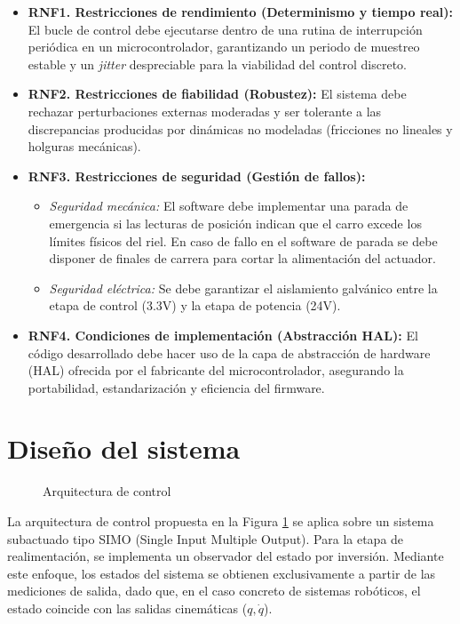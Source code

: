 \documentclass[11pt,fleqn]{book} %
\begin{document}
\begin{itemize}
	\item \textbf{RNF1. Restricciones de rendimiento (Determinismo y tiempo real):} El bucle de control debe ejecutarse dentro de una rutina de interrupción periódica en un microcontrolador, garantizando un periodo de muestreo estable y un \textit{jitter} despreciable para la viabilidad del control discreto.
	
	\item \textbf{RNF2. Restricciones de fiabilidad (Robustez):} El sistema debe rechazar perturbaciones externas moderadas y ser tolerante a las discrepancias producidas por dinámicas no modeladas (fricciones no lineales y holguras mecánicas).
	
	\item \textbf{RNF3. Restricciones de seguridad (Gestión de fallos):} 
	\begin{itemize}
		\item \textit{Seguridad mecánica:} El software debe implementar una parada de emergencia si las lecturas de posición indican que el carro excede los límites físicos del riel. En caso de fallo en el software de parada se debe disponer de finales de carrera para cortar la alimentación del actuador. 
		\item \textit{Seguridad eléctrica:} Se debe garantizar el aislamiento galvánico entre la etapa de control (3.3V) y la etapa de potencia (24V).
	\end{itemize}
	
	\item \textbf{RNF4. Condiciones de implementación (Abstracción HAL):} El código desarrollado debe hacer uso de la capa de abstracción de hardware (HAL) ofrecida por el fabricante del microcontrolador, asegurando la portabilidad, estandarización y eficiencia del firmware.
\end{itemize}

\newpage
\section{Diseño del sistema}
\begin{figure}[ht]
	\centering
	\resizebox{\textwidth}{!}{%
		
	}
	\caption{Arquitectura de control}
	\label{fig:arquitectura_control}
\end{figure}
\FloatBarrier

La arquitectura de control propuesta en la Figura \ref{fig:arquitectura_control} se aplica sobre un sistema subactuado tipo SIMO (Single Input Multiple Output). Para la etapa de realimentación, se implementa un observador del estado por inversión. Mediante este enfoque, los estados del sistema se obtienen exclusivamente a partir de las mediciones de salida, dado que, en el caso concreto de sistemas robóticos, el estado coincide con las salidas cinemáticas ($q, \dot{q}$).
\end{document}
